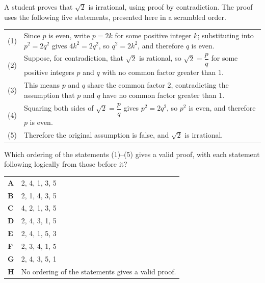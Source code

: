 \documentclass[11pt,a4paper]{article}
\begin{document}
\begin{enumerate}[label=\textbf{\arabic*.},leftmargin=*,itemsep=0pt,start=5]
A student proves that $\sqrt{2}$ is irrational, using proof by contradiction. The proof uses the following five statements, presented here in a scrambled order. \\

\begin{tabular}{@{}r@{\hspace{0.6em}}p{\dimexpr\linewidth-2.6em\relax}@{}}
(1) &
Since $p$ is even, write $p = 2k$ for some positive integer $k$; substituting into $p^2 = 2q^2$ gives $4k^2 = 2q^2$, so $q^2 = 2k^2$, and therefore $q$ is even.
\\[0.8em]

(2) &
Suppose, for contradiction, that $\sqrt{2}$ is rational, so $\sqrt{2} = \dfrac{p}{q}$ for some positive integers $p$ and $q$ with no common factor greater than $1$.
\\[0.8em]

(3) &
This means $p$ and $q$ share the common factor $2$, contradicting the assumption that $p$ and $q$ have no common factor greater than $1$.
\\[0.8em]

(4) &
Squaring both sides of $\sqrt{2} = \dfrac{p}{q}$ gives $p^2 = 2q^2$, so $p^2$ is even, and therefore $p$ is even.
\\[0.8em]

(5) &
Therefore the original assumption is false, and $\sqrt{2}$ is irrational.\\[0.8em]
\end{tabular}

\medskip

Which ordering of the statements (1)--(5) gives a valid proof, with each statement following logically from those before it?

\par\vspace*{12pt}
\begin{tabularx}{\linewidth}{@{}>{\bfseries}l Y@{}}
A &
2, 4, 1, 3, 5
\\[0.8em]
B &
2, 1, 4, 3, 5
\\[0.8em]
C &
4, 2, 1, 3, 5
\\[0.8em]
D &
2, 4, 3, 1, 5
\\[0.8em]
E &
2, 4, 1, 5, 3
\\[0.8em]
F &
2, 3, 4, 1, 5
\\[0.8em]
G &
2, 4, 3, 5, 1
\\[0.8em]
H &
No ordering of the statements gives a valid proof.
\\
\end{tabularx}
\end{enumerate}
\end{document}
